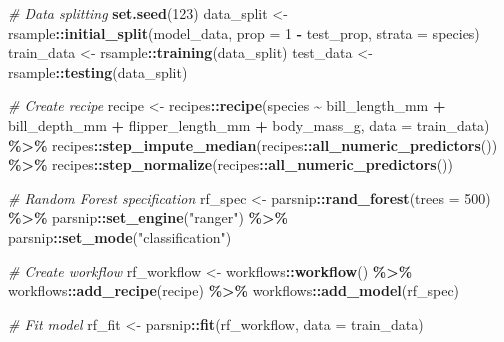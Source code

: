 \documentclass[
]{article}
\newenvironment{Shaded}{\begin{snugshade}}{\end{snugshade}}
\newcommand{\AttributeTok}[1]{\textcolor[rgb]{0.13,0.29,0.53}{#1}}
\newcommand{\CommentTok}[1]{\textcolor[rgb]{0.56,0.35,0.01}{\textit{#1}}}
\newcommand{\DecValTok}[1]{\textcolor[rgb]{0.00,0.00,0.81}{#1}}
\newcommand{\FunctionTok}[1]{\textcolor[rgb]{0.13,0.29,0.53}{\textbf{#1}}}
\newcommand{\NormalTok}[1]{#1}
\newcommand{\OtherTok}[1]{\textcolor[rgb]{0.56,0.35,0.01}{#1}}
\newcommand{\SpecialCharTok}[1]{\textcolor[rgb]{0.81,0.36,0.00}{\textbf{#1}}}
\newcommand{\StringTok}[1]{\textcolor[rgb]{0.31,0.60,0.02}{#1}}
\begin{document}
\begin{Shaded}
\begin{Highlighting}[]
  \CommentTok{\# Data splitting}
  \FunctionTok{set.seed}\NormalTok{(}\DecValTok{123}\NormalTok{)}
\NormalTok{  data\_split }\OtherTok{\textless{}{-}}\NormalTok{ rsample}\SpecialCharTok{::}\FunctionTok{initial\_split}\NormalTok{(model\_data, }\AttributeTok{prop =} \DecValTok{1} \SpecialCharTok{{-}}\NormalTok{ test\_prop, }\AttributeTok{strata =}\NormalTok{ species)}
\NormalTok{  train\_data }\OtherTok{\textless{}{-}}\NormalTok{ rsample}\SpecialCharTok{::}\FunctionTok{training}\NormalTok{(data\_split)}
\NormalTok{  test\_data }\OtherTok{\textless{}{-}}\NormalTok{ rsample}\SpecialCharTok{::}\FunctionTok{testing}\NormalTok{(data\_split)}

  \CommentTok{\# Create recipe}
\NormalTok{  recipe }\OtherTok{\textless{}{-}}\NormalTok{ recipes}\SpecialCharTok{::}\FunctionTok{recipe}\NormalTok{(species }\SpecialCharTok{\textasciitilde{}}\NormalTok{ bill\_length\_mm }\SpecialCharTok{+}\NormalTok{ bill\_depth\_mm }\SpecialCharTok{+}
\NormalTok{                           flipper\_length\_mm }\SpecialCharTok{+}\NormalTok{ body\_mass\_g, }\AttributeTok{data =}\NormalTok{ train\_data) }\SpecialCharTok{\%\textgreater{}\%}
\NormalTok{    recipes}\SpecialCharTok{::}\FunctionTok{step\_impute\_median}\NormalTok{(recipes}\SpecialCharTok{::}\FunctionTok{all\_numeric\_predictors}\NormalTok{()) }\SpecialCharTok{\%\textgreater{}\%}
\NormalTok{    recipes}\SpecialCharTok{::}\FunctionTok{step\_normalize}\NormalTok{(recipes}\SpecialCharTok{::}\FunctionTok{all\_numeric\_predictors}\NormalTok{())}

  \CommentTok{\# Random Forest specification}
\NormalTok{  rf\_spec }\OtherTok{\textless{}{-}}\NormalTok{ parsnip}\SpecialCharTok{::}\FunctionTok{rand\_forest}\NormalTok{(}\AttributeTok{trees =} \DecValTok{500}\NormalTok{) }\SpecialCharTok{\%\textgreater{}\%}
\NormalTok{    parsnip}\SpecialCharTok{::}\FunctionTok{set\_engine}\NormalTok{(}\StringTok{"ranger"}\NormalTok{) }\SpecialCharTok{\%\textgreater{}\%}
\NormalTok{    parsnip}\SpecialCharTok{::}\FunctionTok{set\_mode}\NormalTok{(}\StringTok{"classification"}\NormalTok{)}

  \CommentTok{\# Create workflow}
\NormalTok{  rf\_workflow }\OtherTok{\textless{}{-}}\NormalTok{ workflows}\SpecialCharTok{::}\FunctionTok{workflow}\NormalTok{() }\SpecialCharTok{\%\textgreater{}\%}
\NormalTok{    workflows}\SpecialCharTok{::}\FunctionTok{add\_recipe}\NormalTok{(recipe) }\SpecialCharTok{\%\textgreater{}\%}
\NormalTok{    workflows}\SpecialCharTok{::}\FunctionTok{add\_model}\NormalTok{(rf\_spec)}

  \CommentTok{\# Fit model}
\NormalTok{  rf\_fit }\OtherTok{\textless{}{-}}\NormalTok{ parsnip}\SpecialCharTok{::}\FunctionTok{fit}\NormalTok{(rf\_workflow, }\AttributeTok{data =}\NormalTok{ train\_data)}


\end{Highlighting}
\end{Shaded}
\end{document}
